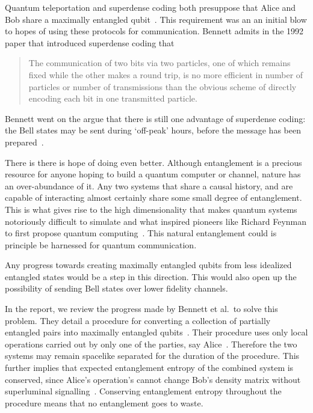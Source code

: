 Quantum teleportation and superdense coding both presuppose that Alice and Bob share a maximally entangled qubit~\cite{barrett2004teleportation, bennett1992superdense}. 
This requirement was an an initial blow to hopes of using these protocols for communication.
Bennett admits in the 1992 paper that introduced superdense coding that

\hyphenblockcquote{UKenglish}{bennett1992superdense}{
The communication of two bits via two particles, one of which remains fixed while the other makes a round trip, is no more efficient in number of particles or number of transmissions than the obvious scheme of directly encoding each bit in one transmitted particle.
}

Bennett went on the argue that there is still one advantage of superdense coding: the Bell states may be sent during `off-peak' hours, before the message has been prepared~\cite{bennett1992superdense}.

There is there is hope of doing even better.
Although entanglement is a precious resource for anyone hoping to build a quantum computer or channel, nature has an over-abundance of it. 
Any two systems that share a causal history, and are capable of interacting almost certainly share some small degree of entanglement.
This is what gives rise to the high dimensionality that makes quantum systems notoriously difficult to simulate and what inspired pioneers like Richard Feynman to first propose quantum computing~\cite{feynman1982simulating}.
This natural entanglement could is principle be harnessed for quantum communication.

Any progress towards creating maximally entangled qubits from less idealized entangled states would be a step in this direction.
This would also open up the possibility of sending Bell states over lower fidelity channels.

In the report, we review the progress made by Bennett et al.\ to solve this problem.
They detail a procedure for converting a collection of partially entangled pairs into maximally entangled qubits~\cite{bennett1996concentrating}.
Their procedure uses only local operations carried out by only one of the parties, say Alice~\cite{bennett1996concentrating}. Therefore the two systems may remain spacelike separated for the duration of the procedure.
This further implies that expected entanglement entropy of the combined system is conserved, since Alice's operation's cannot change Bob's density matrix without superluminal signalling~\cite{bennett1996concentrating}. Conserving entanglement entropy throughout the procedure means that no entanglement goes to waste.

